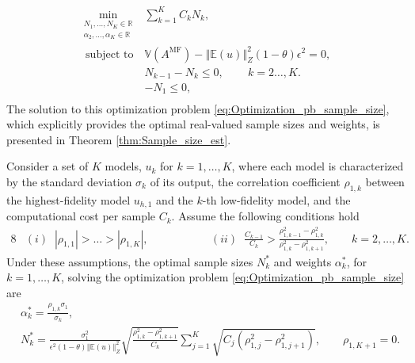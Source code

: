%
\begin{equation}\label{eq:Optimization_pb_sample_size}
    \begin{array}{ll}
    \min \limits_{\begin{array}{c}\scriptstyle N_1,\ldots, N_K\in \mathbb{R} \\[-4pt]
\scriptstyle \alpha_2,\ldots,\alpha_K\in \mathbb{R}
\end{array}} &\displaystyle\sum\limits_{k=1}^K C_kN_k,\\
       \;\,\text{subject to} &\mathbb{V}\left(A^{\text{MF}}\right)- \left\Vert\mathbb{E}(u) \right\Vert_{Z}^2(1-\theta)\epsilon^2 = 0,\\[2pt]
       &\displaystyle N_{k-1}-N_k\le 0, \quad\quad\, k=2\ldots,K.\\[1pt]
        &\displaystyle -N_1\le 0, \\
    \end{array}
\end{equation}
%
The solution to this optimization problem \eqref{eq:Optimization_pb_sample_size}, which explicitly provides the optimal real-valued sample sizes and weights, is presented in Theorem \ref{thm:Sample_size_est}.
%
\begin{theorem}
\label{thm:Sample_size_est}
Consider a set of $K$ models, $u_k$ for $k=1,\ldots,K$, where each model is characterized by the standard deviation $\sigma_k$ of its output, the correlation coefficient $\rho_{1,k}$ between the highest-fidelity model $u_{h,1}$ and the $k$-th low-fidelity model, and the computational cost per sample $C_k$. Assume the following conditions hold
%
\begin{alignat*}{8}
    &(i)\;\; |\rho_{1,1}|>\ldots>|\rho_{1,K}|,& \qquad \qquad
    &(ii)\;\; \frac{C_{k-1}}{C_k}>\frac{\rho_{1,k-1}^2-\rho_{1,k}^2}{\rho_{1,k}^2-\rho_{1,k+1}^2},\quad \quad k=2,\ldots,K.
\end{alignat*}
%
Under these assumptions, the optimal sample sizes $N_k^*$ and weights $\alpha_k^*$, for $k=1,\ldots, K$, solving the optimization problem \eqref{eq:Optimization_pb_sample_size} are
%
\begin{align}
    \label{eq:MFMC_coefficients}
    &\alpha_k^*=\frac{\rho_{1,k}\sigma_1}{\sigma_k},\\
    \label{eq:MFMC_SampleSize}
    &N_k^*=\frac{\sigma_1^2}{\epsilon^2(1-\theta)\left\Vert\mathbb{E}(u) \right\Vert_{Z}^2}\sqrt{\frac{\rho_{1,k}^2-\rho_{1,k+1}^2}{C_k}}\sum_{j=1}^K\sqrt{C_j\left(\rho_{1,j}^2-\rho_{1,j+1}^2\right)}, \quad\quad \rho_{1,K+1}=0.
\end{align}
%
\end{theorem}
%

